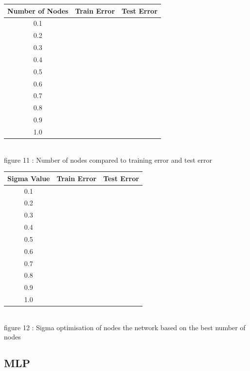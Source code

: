 \documentclass{IEEEtran}
\begin{document}
\begin{center}
\begin{tabular}{||c c c||}
  \hline
Number of Nodes & Train Error & Test Error \\ [0.5ex]
\hline
0.1 \\
0.2 \\
0.3 \\
0.4 \\
0.5 \\
0.6 \\
0.7 \\
0.8 \\
0.9 \\
1.0 \\
\end{tabular}
\\
\vspace{2.5mm}
{\footnotesize figure 11 : Number of nodes compared to training error and
test error}
\end{center}
\begin{center}
\begin{tabular}{||c c c||}
  \hline
Sigma Value & Train Error & Test Error \\ [0.5ex]
\hline
0.1 \\
0.2 \\
0.3 \\
0.4 \\
0.5 \\
0.6 \\
0.7 \\
0.8 \\
0.9 \\
1.0 \\
\hline
\end{tabular}
\\
\vspace{2.5mm}
{\footnotesize figure 12 : Sigma optimisation of nodes the network based on the
best number of nodes}
\end{center}
\subsection{MLP}
\end{document}
